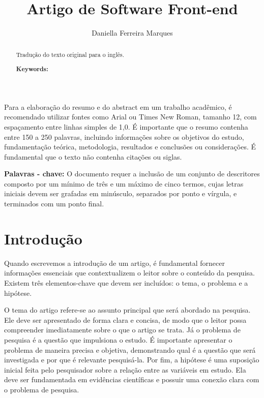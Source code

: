 \documentclass[12pt]{article}
\title{Artigo de Software Front-end}
\author{Daniella Ferreira Marques}
\begin{document}
 

\maketitle

\begin{abstract}
  Tradução do texto original para o inglês.   
  
  \textbf{Keywords:}
\end{abstract}
     
\begin{resumo}
   Para a elaboração do resumo e do abstract em um trabalho acadêmico, é recomendado utilizar fontes como Arial ou Times New Roman, tamanho 12, com espaçamento entre linhas simples de 1,0. É importante que o resumo contenha entre 150 a 250 palavras, incluindo informações sobre os objetivos do estudo, fundamentação teórica, metodologia, resultados e conclusões ou considerações. É fundamental que o texto não contenha citações ou siglas.  

   
   \textbf{Palavras - chave:} O documento requer a inclusão de um conjunto de descritores composto por um mínimo de três e um máximo de cinco termos, cujas letras iniciais devem ser grafadas em minúsculo, separados por ponto e vírgula, e terminados com um ponto final.
\end{resumo}


\section{Introdução}

Quando escrevemos a introdução de um artigo, é fundamental fornecer informações essenciais que contextualizem o leitor sobre o conteúdo da pesquisa. Existem três elementos-chave que devem ser incluídos: o tema, o problema e a hipótese.

O tema do artigo refere-se ao assunto principal que será abordado na pesquisa. Ele deve ser apresentado de forma clara e concisa, de modo que o leitor possa compreender imediatamente sobre o que o artigo se trata. Já o problema de pesquisa é a questão que impulsiona o estudo. É importante apresentar o problema de maneira precisa e objetiva, demonstrando qual é a questão que será investigada e por que é relevante pesquisá-la. Por fim, a hipótese é uma suposição inicial feita pelo pesquisador sobre a relação entre as variáveis em estudo. Ela deve ser fundamentada em evidências científicas e possuir uma conexão clara com o problema de pesquisa.
\end{document}
